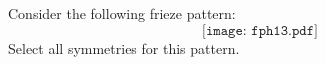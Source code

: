 \documentclass{ximera}
\author{Bart Snapp}
\begin{document}
\begin{exercise}
  Consider the following frieze pattern:
  \[
  \texttt{[image: fph13.pdf]}
  \]
  Select all symmetries for this pattern.
  \begin{selectAll}
  \end{selectAll}
\end{exercise}
\end{document}
